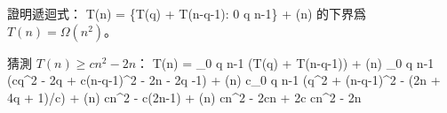 \startEXERCISE
證明遞迴式：
\startformula
T(n) = \max\{T(q) + T(n-q-1): 0 \le q \le n-1\} + \Theta(n)
\stopformula
的下界爲 $T(n)=\Omega(n^2)$。
\stopEXERCISE

\startANSWER
猜測 $T(n)\ge cn^2-2n$：
\startsplitformula\startmathalignment
\NC T(n) \NC=   \max_{0 \le q \le n-1} (T(q) + T(n-q-1)) + \Theta(n) \NR
\NC      \NC\ge \max_{0 \le q \le n-1} (cq^2 - 2q + c(n-q-1)^2 - 2n - 2q -1) + \Theta(n) \NR
\NC      \NC\ge c\max_{0 \le q \le n-1} (q^2 + (n-q-1)^2 - (2n + 4q + 1)/c) + \Theta(n) \NR
\NC      \NC\ge cn^2 - c(2n-1) + \Theta(n) \NR
\NC      \NC\ge cn^2 - 2cn + 2c  \NR
\NC      \NC\ge cn^2 - 2n \NR
\stopmathalignment\stopsplitformula
\stopANSWER
